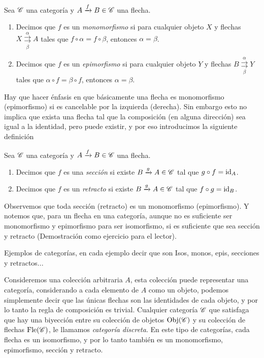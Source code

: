 \documentclass{comunicaciones}
\begin{document}
\begin{dfn}
    Sea $\mathscr C$ una categoría y $A\xrightarrow{f}B\in\mathscr C$ una flecha. 
    \begin{enumerate}
        \item Decimos que $f$ es un \emph{monomorfismo} si para cualquier objeto $X$ y flechas $X\overset{\alpha}{\underset{\beta}{\rightrightarrows}}A$
              tales que $f\circ\alpha=f\circ\beta$, entonces $\alpha=\beta$. 
        \item Decimos que $f$ es un \emph{epimorfismo} si para cualquier objeto $Y$ y flechas $B\overset{\alpha}{\underset{\beta}{\rightrightarrows}}Y$
              tales que $\alpha\circ f=\beta\circ f$, entonces $\alpha=\beta$.
    \end{enumerate}
\end{dfn}
Hay que hacer énfasis en que básicamente una flecha es monomorfismo (epimorfismo) si es cancelable por la izquierda (derecha). Sin embargo esto no implica
que exista una flecha tal que la composición (en alguna dirección) sea igual a la identidad, pero puede existir, y por eso introducimos la siguiente definición
\begin{dfn}
    Sea $\mathscr C$ una categoría y $A\xrightarrow{f}B\in\mathscr C$ una flecha. 
    \begin{enumerate}
        \item Decimos que $f$ es una \emph{sección} si existe $B\xrightarrow{g}A\in\mathscr C$ tal que $g\circ f=\mathrm{id}_A$. 
        \item Decimos que $f$ es un \emph{retracto} si existe $B\xrightarrow{g}A\in\mathscr C$ tal que $f\circ g=\mathrm{id}_B$.
    \end{enumerate}
\end{dfn}

Observemos que toda sección (retracto) es un monomorfismo (epimorfismo). Y notemos que, para un flecha en una categoría, aunque no es suficiente ser monomorfismo
y epimorfismo para ser isomorfismo, si es suficiente que sea sección y retracto (Demostración como ejercicio para el lector).

Ejemplos de categorías, en cada ejemplo decir que son Isos, monos, epis, secciones y retractos...

\begin{ej}
    Consideremos una colección arbitraria $A$, esta colección puede representar una categoría, considerando a cada elemento de $A$ como un objeto, podemos
    simplemente decir que las únicas flechas son las identidades de cada objeto, y por lo tanto la regla de composición es trivial.
    Cualquier categoría $\mathscr C$ que satisfaga que hay una biyección entre su colección de objetos $\mathrm{Obj}(\mathscr C)$ y su colección de flechas $\mathrm{Fle}(\mathscr C)$, le llamamos
    \emph{categoría discreta}. En este tipo de categorías, cada flecha es un isomorfismo, y por lo tanto también es un monomorfismo, epimorfismo, sección y retracto.
\end{ej}
\end{document}
